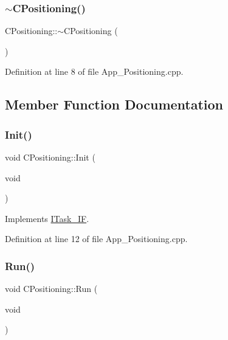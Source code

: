 \subsubsection{\texorpdfstring{$\sim$\+C\+Positioning()}{~CPositioning()}}
{\footnotesize\ttfamily C\+Positioning\+::$\sim$\+C\+Positioning (\begin{DoxyParamCaption}{ }\end{DoxyParamCaption})}



Definition at line 8 of file App\+\_\+\+Positioning.\+cpp.



\subsection{Member Function Documentation}
\mbox{\label{class_c_positioning_abdceba66e701554a178acf61c61b0df6}} 
\subsubsection{\texorpdfstring{Init()}{Init()}}
{\footnotesize\ttfamily void C\+Positioning\+::\+Init (\begin{DoxyParamCaption}\item[{void}]{ }\end{DoxyParamCaption})\hspace{0.3cm}{\ttfamily [virtual]}}



Implements \mbox{\hyperlink{class_i_task___i_f_a28f608bdb9b19658403f7b9b7421968d}{I\+Task\+\_\+\+IF}}.



Definition at line 12 of file App\+\_\+\+Positioning.\+cpp.

\mbox{\label{class_c_positioning_ad0e439dcc95c450548c2806077aeff57}} 
\subsubsection{\texorpdfstring{Run()}{Run()}}
{\footnotesize\ttfamily void C\+Positioning\+::\+Run (\begin{DoxyParamCaption}\item[{void}]{ }\end{DoxyParamCaption})\hspace{0.3cm}{\ttfamily [virtual]}}




